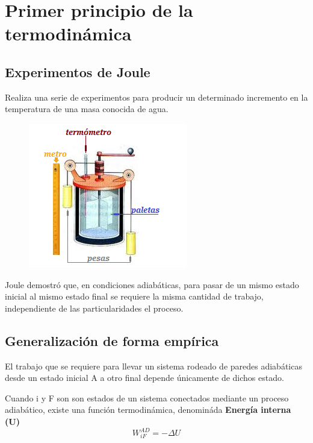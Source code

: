 \documentclass[12pt,twocolumn,a4paper]{report}
\begin{document}
\chapter*{Primer principio de la termodinámica}
\section*{Experimentos de Joule}
Realiza una serie de experimentos para producir un determinado incremento en la temperatura de una masa conocida de agua. 
\begin{figure}[H]
\centering
\includegraphics[scale=0.9]{graficos/j1.png}
\end{figure}

Joule demostró que, en condiciones adiabáticas, para pasar de un mismo estado inicial al mismo estado final se requiere la misma cantidad de trabajo, independiente de las particularidades el proceso. 

\section*{Generalización de forma empírica}
El trabajo que se requiere para llevar un sistema rodeado de paredes adiabáticas desde un estado inicial A a otro final depende únicamente de dichos estado.

Cuando i y F son son estados de un sistema conectados mediante un proceso adiabático, existe una función termodinámica, denomináda \textbf{Energía interna (U)}
\begin{equation*}
W_{iF}^{AD} = -\Delta U
\end{equation*}
\end{document}
